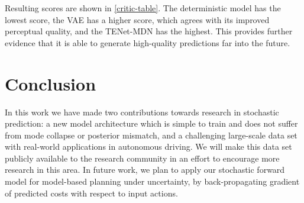 \documentclass{article}
\begin{document}
Resulting scores are shown in \cref{critic-table}.
The deterministic model has the lowest score, the VAE has a higher score, which agrees with its improved perceptual quality, and the TENet-MDN has the highest.
This provides further evidence that it is able to generate high-quality predictions far into the future.

\section{Conclusion}

In this work we have made two contributions towards research in stochastic prediction: a new model architecture which is simple to train and does not suffer from mode collapse or posterior mismatch, and a challenging large-scale data set with real-world applications in autonomous driving.
We will make this data set publicly available to the research community in an effort to encourage more research in this area.
In future work, we plan to apply our stochastic forward model for model-based planning under uncertainty, by back-propagating gradient of predicted costs with respect to input actions.

%
%
%
%
%
%
\end{document}
